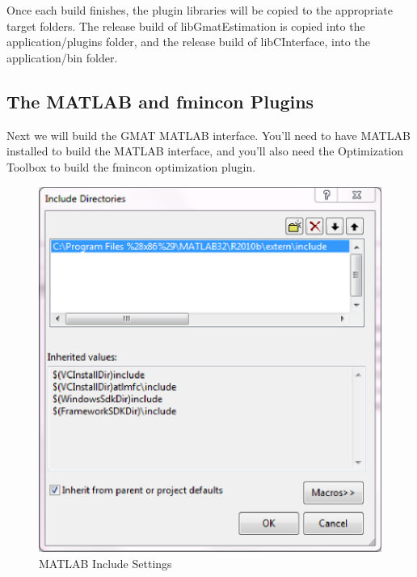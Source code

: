 \documentclass[letterpaper,10pt]{article}%
\begin{document}
{Once each build finishes, the plugin libraries will be copied to the appropriate target folders.  The release build of libGmatEstimation is copied into the application/plugins folder, and the release build of libCInterface, into the application/bin folder.

\subsection{The MATLAB and fmincon Plugins}

Next we will build the GMAT MATLAB interface.  You'll need to have MATLAB installed to build the MATLAB interface, and you'll also need the Optimization Toolbox to build the fmincon optimization plugin.

\begin{figure}
\centering
\includegraphics[scale = 0.6]{SettingIncludeFolder.eps}
\caption{MATLAB Include Settings}
\label{fig:SettingIncludeFolder}
\end{figure}


}
\end{document}
